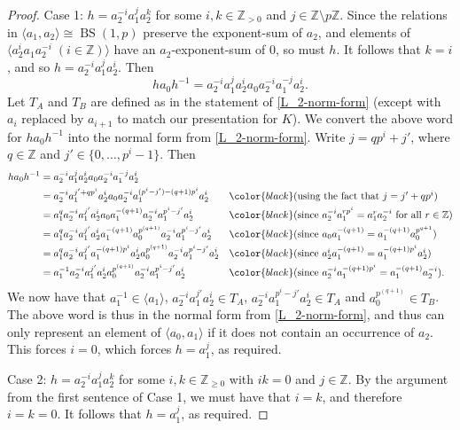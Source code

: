 \documentclass[11pt]{amsart}
\theoremstyle{definition}
\numberwithin{theorem}{section}
\DeclareMathOperator{\BS}{BS}
\newcommand{\Z}{\mathbb{Z}}
\begin{document}
\begin{proof}
	Case 1: \(h = a_2^{-i} a_1^j a_2^k\) for some \(i, k \in \Z_{> 0}\) and \(j
	\in \Z \setminus p \Z\). Since the relations in \(\langle a_1, a_2 \rangle
	\cong \BS(1, p)\) preserve the exponent-sum of \(a_2\), and elements of
	\(\langle a_2^i a_1 a_2^{-i} \; (i \in \Z) \rangle\) have an \(a_2\)-exponent-sum
	of \(0\), so must \(h\). It follows that \(k = i\), and so
	\(h = a_2^{-i} a_1^j a_2^i\). Then
	\[
		ha_0 h^{-1} = a_2^{-i} a_1^j a_2^i a_0 a_2^{-i} a_1^{-j} a_2^i.
	\]
	Let \(T_A\) and \(T_B\) are defined as in the
	statement of \cref{L_2-norm-form} (except with \(a_i\) replaced by \(a_{i + 1}\) to match
	our presentation for \(K\)). We convert the above word for \(ha_0 h^{-1}\)
	into the normal form from \cref{L_2-norm-form}.  Write \(j = q p^i +  j'\), where \(q \in
	\Z\) and \(j' \in \{0, \ldots, p^i - 1\}\). Then 
	\begin{align*}
		ha_0h^{-1}
		& = a_2^{-i} a_1^j a_2^i a_0 a_2^{-i} a_1^{-j} a_2^i & &
		\\
		& = a_2^{-i} a_1^{j' + q p^i} a_2^i a_0 a_2^{-i} a_1^{(p^i -j') - (q + 1)p^i} a_2^i & & {\color{black} \mbox{(using the fact that \(j = j' + qp^i\)) }} \\
		& = a_1^q a_2^{-i} a_1^{j'} a_2^i a_0 a_1^{-(q + 1)} a_2^{-i} a_1^{p^i -j'} a_2^i & & 
		{\color{black} \mbox{(since \(a_2^{-i} a_1^{rp^i} = a_1^r a_2^{-i}\) for all \(r \in \Z\))}} \\
		& = a_1^q a_2^{-i} a_1^{j'} a_2^i a_1^{-(q + 1)} a_0^{p^{(q + 1)}} a_2^{-i} a_1^{p^i - j'} a_2^i 
		&& {\color{black} \mbox{(since \(a_0 a_1^{-(q + 1)} = a_1^{-(q + 1)} a_0^{p^{q + 1}}\))}} \\
		& = a_1^q a_2^{-i} a_1^{j'} a_1^{-(q + 1)p^i} a_2^i a_0^{p^{(q + 1)}} a_2^{-i} a_1^{p^i - j'} a_2^i 
		&& {\color{black} \mbox{(since \(a_2^i a_1^{-(q + 1)} = a_1^{-(q + 1)p^i} a_2^i\))}} \\
		& = a_1^{-1} a_2^{-i} a_1^{j'} a_2^i a_0^{p^{(q + 1)}} a_2^{-i} a_1^{p^i - j'} a_2^i 
		&& {\color{black} \mbox{(since \(a_2^{-i} a_1^{-(q + 1)p^i} = a_1^{-(q + 1)} a_2^{-i}\)).}} 
	\end{align*}
	We now have that \(a_1^{-1} \in \langle a_1 \rangle\), \(a_2^{-i} a_1^{j'}
	a_2^i \in T_A\), \( a_2^{-i} a_1^{p^i - j'} a_2^i \in T_A\) and
	\(a_0^{p^{(q + 1)}} \in T_B\). The above word is thus in the normal form
	from \cref{L_2-norm-form}, and thus can only represent an element of
	\(\langle a_0, a_1 \rangle\) if it does not contain an occurrence of
	\(a_2\). This forces \(i = 0\), which forces \(h = a_1^j\), as required.

	Case 2: \(h = a_2^{-i} a_1^j a_2^k\) for some \(i, k \in \Z_{\geq 0}\) with
	\(ik = 0\) and \(j \in \Z\). By the argument from the first sentence of
	Case 1, we must have that \(i = k\), and therefore \(i = k = 0\). It
	follows that \(h = a_1^j\), as required.
\end{proof}
\end{document}
